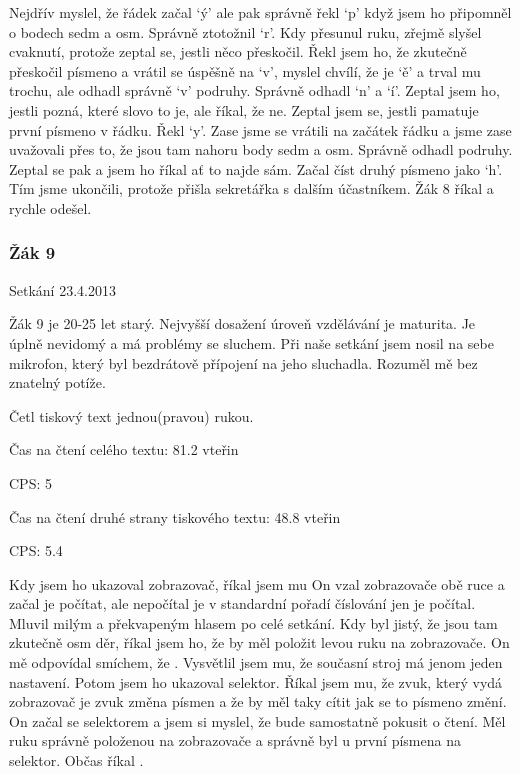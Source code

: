 Nejdřív myslel, že řádek začal `ý' ale pak správně řekl `p' když jsem ho připomněl o bodech sedm a osm.  Správně ztotožnil `r'.  Kdy přesunul ruku, zřejmě slyšel cvaknutí, protože zeptal se, jestli něco přeskočil.  Řekl jsem ho, že zkutečně přeskočil písmeno a vrátil se úspěšně na `v', myslel chvílí, že je `ě' a trval mu trochu, ale odhadl správně `v' podruhy.  Správně odhadl `n' a `í'.  Zeptal jsem ho, jestli pozná, které slovo to je, ale říkal, že ne.  Zeptal jsem se, jestli pamatuje první písmeno v řádku.  Řekl `y'.  Zase jsme se vrátili na začátek řádku a jsme zase uvažovali přes to, že jsou tam nahoru body sedm a osm.  Správně odhadl podruhy.  Zeptal se pak  a jsem ho říkal ať to najde sám.  Začal číst druhý písmeno jako `h'. Tím jsme ukončili, protože přišla sekretářka s dalším účastníkem.  Žák 8 říkal  a rychle odešel.

\subsubsection{Žák 9}
Setkání 23.4.2013

Žák 9 je 20-25 let starý.  Nejvyšší dosažení úroveň vzdělávání je maturita.  Je úplně nevidomý a má problémy se sluchem.  Při naše setkání jsem nosil na sebe mikrofon, který byl bezdrátově přípojení na jeho sluchadla.  Rozuměl mě bez znatelný potíže.

Četl tiskový text jednou(pravou) rukou.

Čas na čtení celého textu: 81.2 vteřin

CPS: 5

Čas na čtení druhé strany tiskového textu: 48.8 vteřin

CPS: 5.4

Kdy jsem ho ukazoval zobrazovač, říkal jsem mu  On vzal zobrazovače obě ruce a začal je počítat, ale nepočítal je v standardní pořadí číslování jen je počítal.  Mluvil milým a překvapeným hlasem po celé setkání. Kdy byl jistý, že jsou tam zkutečně osm děr, říkal jsem ho, že by měl položit levou ruku na zobrazovače.  On mě odpovídal smíchem, že . Vysvětlil jsem mu, že současní stroj má jenom jeden nastavení.  Potom jsem ho ukazoval selektor.  Říkal jsem mu, že zvuk, který vydá zobrazovač je zvuk změna písmen a že by měl taky cítit jak se to písmeno změní.  On začal  se selektorem a jsem si myslel, že bude samostatně pokusit o čtení.  Měl ruku správně položenou na zobrazovače a správně byl u první písmena na selektor.  Občas říkal .


